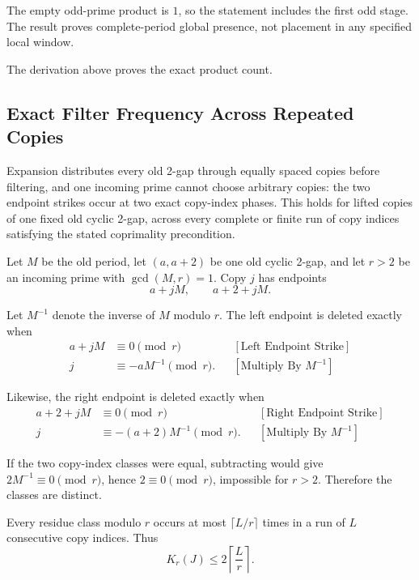 The empty odd-prime product is $1$, so the statement includes the first
odd stage. The result proves complete-period global presence, not
placement in any specified local window.

{\raggedright
The derivation above proves the exact product count. \par}

\subsection{Exact Filter Frequency Across Repeated Copies}
\label{sec:exact-filter-frequency}

Expansion distributes every old 2-gap through equally spaced copies
before filtering, and one incoming prime cannot choose arbitrary copies:
the two endpoint strikes occur at two exact copy-index phases. This holds
for lifted copies of one fixed old cyclic 2-gap, across every complete or
finite run of copy indices satisfying the stated coprimality
precondition.

Let $M$ be the old period, let $(a,a+2)$ be one old cyclic 2-gap, and let
$r>2$ be an incoming prime with $\gcd(M,r)=1$. Copy $j$ has endpoints
\begin{equation*}
a+jM,
\qquad
a+2+jM.
\end{equation*}

Let $M^{-1}$ denote the inverse of $M$ modulo $r$. The left endpoint is
deleted exactly when
\begin{equation*}
\begin{aligned}
a+jM&\equiv0\pmod r
&&[\text{Left Endpoint Strike}]\\
j&\equiv-aM^{-1}\pmod r.
&&[\text{Multiply By }M^{-1}]
\end{aligned}
\end{equation*}

Likewise, the right endpoint is deleted exactly when
\begin{equation*}
\begin{aligned}
a+2+jM&\equiv0\pmod r
&&[\text{Right Endpoint Strike}]\\
j&\equiv-(a+2)M^{-1}\pmod r.
&&[\text{Multiply By }M^{-1}]
\end{aligned}
\end{equation*}

If the two copy-index classes were equal, subtracting would give
$2M^{-1}\equiv0\pmod r$, hence $2\equiv0\pmod r$, impossible for $r>2$.
Therefore the classes are distinct.

Every residue class modulo $r$ occurs at most $\lceil L/r\rceil$ times in
a run of $L$ consecutive copy indices. Thus
\begin{equation*}
K_r(J)\le2\left\lceil\frac{L}{r}\right\rceil.
\end{equation*}

